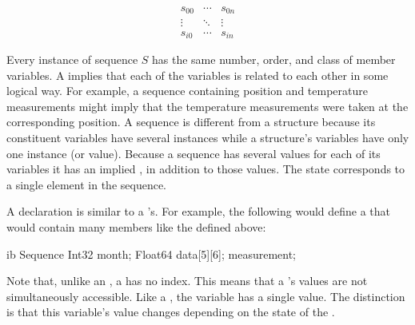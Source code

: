 \begin{description}
\begin{displaymath}
\begin{array}{ccc}
  s_{0 0} & \cdots & s_{0 n} \\ 
  \vdots & \ddots & \vdots \\ 
  s_{i 0} & \cdots & s_{i n}
\end{array}
\end{displaymath}

\noindent Every instance of sequence $S$ has the same number, order,
and class of member variables. A  implies that each of
the variables is related to each other in some logical way. For
example, a sequence containing position and temperature measurements
might imply that the temperature measurements were taken at the
corresponding position. A sequence is different from a structure
because its constituent variables have several instances while a
structure's variables have only one instance (or value). Because a
sequence has several values for each of its variables it has an
implied , in addition to those values. The state
corresponds to a single element in the sequence.

A  declaration is similar to a 's.
For example, the following would define a  that would
contain many members like the  defined above:

\begin{vcode}{ib}
   Sequence {
      Int32 month;
      Float64 data[5][6];
   } measurement;
\end{vcode}

\noindent Note that, unlike an , a  has
no index.  This means that a 's values are not
simultaneously accessible.  Like a , the variable
 has a single value.  The distinction is that
this variable's value changes depending on the state of the
.

%
%


\end{description}

